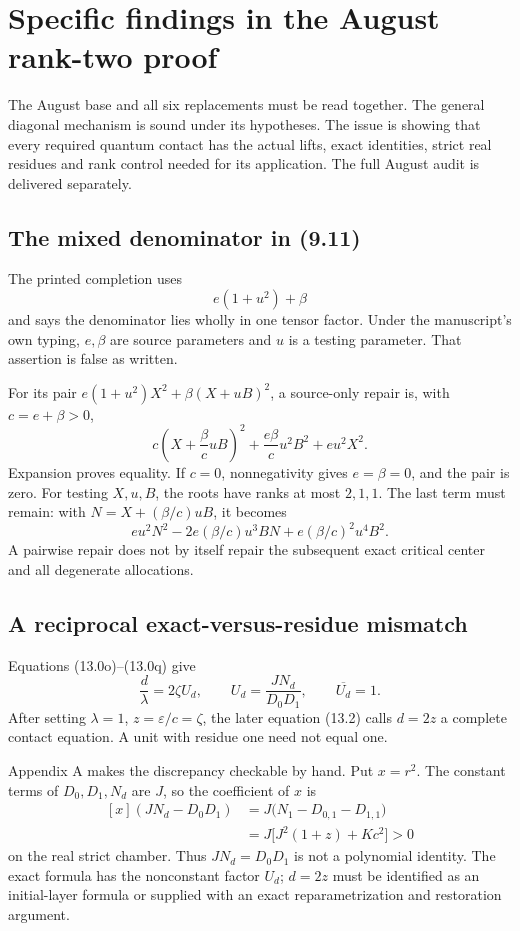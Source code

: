 \section{Specific findings in the August rank-two proof}

The August base and all six replacements must be read together.
The general diagonal mechanism is sound under its hypotheses.
The issue is showing that every required quantum contact has the
actual lifts, exact identities, strict real residues and rank control
needed for its application. The full August audit is delivered separately.

\subsection{The mixed denominator in (9.11)}

The printed completion uses
\[
 e(1+u^2)+\beta
\]
and says the denominator lies wholly in one tensor factor.
Under the manuscript's own typing, \(e,\beta\) are source parameters
and \(u\) is a testing parameter. That assertion is false as written.

For its pair \(e(1+u^2)X^2+\beta(X+uB)^2\), a source-only repair is,
with \(c=e+\beta>0\),
\begin{equation}
 c\left(X+\frac{\beta}{c}uB\right)^2
 +\frac{e\beta}{c}u^2B^2+eu^2X^2.
 \label{eq:repair}
\end{equation}
Expansion proves equality. If \(c=0\), nonnegativity gives
\(e=\beta=0\), and the pair is zero. For testing \(X,u,B\),
the roots have ranks at most \(2,1,1\).
The last term must remain: with \(N=X+(\beta/c)uB\), it becomes
\[
 eu^2N^2-2e(\beta/c)u^3BN+e(\beta/c)^2u^4B^2.
\]
A pairwise repair does not by itself repair the subsequent exact
critical center and all degenerate allocations. 

\subsection{A reciprocal exact-versus-residue mismatch}

Equations (13.0o)--(13.0q) give
\[
 \frac d\lambda=2\zeta U_d,\qquad
 U_d=\frac{JN_d}{D_0D_1},\qquad \overline{U_d}=1.
\]
After setting \(\lambda=1\), \(z=\varepsilon/c=\zeta\), the later
equation (13.2) calls \(d=2z\) a complete contact equation.
A unit with residue one need not equal one.

Appendix A makes the discrepancy checkable by hand.
Put \(x=r^2\). The constant terms of \(D_0,D_1,N_d\) are \(J\),
so the coefficient of \(x\) is
\[
\begin{aligned}
 [x](JN_d-D_0D_1)
 &=J\bigl(N_1-D_{0,1}-D_{1,1}\bigr)\\
 &=J\bigl[J^2(1+z)+Kc^2\bigr]>0
\end{aligned}
\]
on the real strict chamber. Thus \(JN_d=D_0D_1\) is not a
polynomial identity. The exact formula has the nonconstant factor
\(U_d\); \(d=2z\) must be identified as an initial-layer formula or
supplied with an exact reparametrization and restoration argument.

